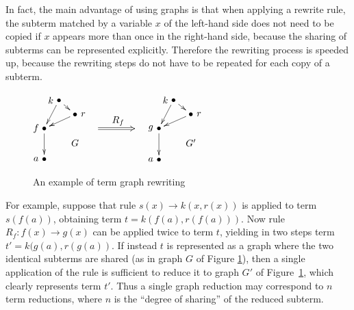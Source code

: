 \documentclass{eptcs}
\theoremstyle{plain}
\theoremstyle{definition}
\begin{document}
In fact, the  main advantage of using graphs is that when applying a rewrite
rule, the subterm matched by a variable $x$ of the left-hand side does
not need to be copied if $x$ appears more than once in the right-hand
side, because the sharing of subterms can be represented
explicitly. Therefore the
rewriting process is speeded up, because the rewriting steps do not
have to be repeated for each copy of a subterm.

\begin{figure}[b]
\centering
$
\xymatrix@=1ex{
& \save []-<.3cm, .0cm>*\txt{$k$} \restore \bullet \ar[dr] \ar[ldd] & \\
& & \save []+<.3cm, .0cm>*\txt{$r$} \restore \bullet \ar[dll]\\
\save []-<.3cm, .0cm>*\txt{$f$} \restore\bullet \ar[dd]& & \\
& &  G\\
\save []-<.3cm, .0cm>*\txt{$a$} \restore \bullet & &
}
$
\hspace{1cm}
$
\xymatrix@=2ex{
& \\
& \\
\mbox{ }\ar@{=>}[rrr]^{\mbox{ $R_f$}} & & & \mbox{ } \\
& \\
& \\
}
$
\hspace{1cm}
$
\xymatrix@=1ex{
& \save []-<.3cm, .0cm>*\txt{$k$} \restore \bullet \ar[dr] \ar[ldd] & \\
& & \save []+<.3cm, .0cm>*\txt{$r$} \restore \bullet \ar[dll]\\
\save []-<.3cm, .0cm>*\txt{$g$} \restore\bullet \ar[dd]& & \\
& &  G'\\
\save []-<.3cm, .0cm>*\txt{$a$} \restore \bullet & &
}
$
\caption[ ]{An example of term graph rewriting}
\label{fi:term-graph-1}
\end{figure}

For example, suppose that rule $s(x) \rightarrow k(x,r(x))$ is applied
to term $s(f(a))$, obtaining term $t = k(f(a), r(f(a)))$. Now 
rule $R_f : f(x) \rightarrow g(x)$ can be applied twice to term
$t$, yielding in two steps term $t' =
k(g(a), r(g(a))$. If instead $t$ is represented as a graph where the
two identical subterms are shared (as in graph $G$ of Figure 
\ref{fi:term-graph-1}), then a single application of the rule is 
sufficient to
reduce it to graph $G'$ of Figure~\ref{fi:term-graph-1},  which 
clearly
represents term $t'$. Thus a single graph reduction may
correspond to $n$ term reductions, where $n$ is the ``degree of
sharing'' of the reduced subterm.
  
\end{document}
